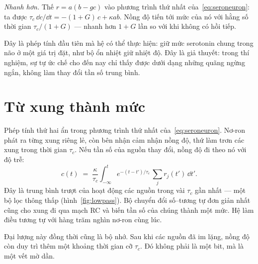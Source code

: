 \emph{Nhanh hơn.} Thế $r=a(b-gc)$ vào phương trình thứ nhất của~\eqref{eq:seroneuron}: ta được $\tau_c\,\dd c/\dd t=-(1+G)\,c+\kappa ab$. Nồng độ tiến tới mức của nó với hằng số thời gian $\tau_c/(1+G)$ --- nhanh hơn $1+G$ lần so với khi không có hồi tiếp.

Đây là phép tính đầu tiên mà hệ  có thể thực hiện: giữ mức serotonin chung trong não ở một giá trị đặt, như bộ ổn nhiệt giữ nhiệt độ. Đây là giả thuyết: trong thí nghiệm, sự tự ức chế cho đến nay chỉ thấy được dưới dạng những quãng ngừng ngắn, không làm thay đổi tần số trung bình.

\section{Từ xung thành mức}

Phép tính thứ hai ẩn trong phương trình thứ nhất của~\eqref{eq:seroneuron}. Nơ-ron phát ra từng xung riêng lẻ, còn bên nhận cảm nhận nồng độ, thứ làm trơn các xung trong thời gian $\tau_c$. Nếu tần số của nguồn thay đổi, nồng độ đi theo nó với độ trễ:
\begin{equation}
c(t) \;=\; \frac{\kappa}{\tau_c}\int_{-\infty}^{t} e^{-(t-t')/\tau_c}\,\sum_j r_j(t')\,\dd t' .
\label{eq:lowpass}
\end{equation}
Đây là trung bình trượt của hoạt động các nguồn trong vài $\tau_c$ gần nhất --- một bộ lọc thông thấp (hình~\ref{fig:lowpass}). Bộ chuyển đổi số--tương tự đơn giản nhất cũng cho xung đi qua mạch RC và biến tần số của chúng thành một mức. Hệ  làm điều tương tự với hàng trăm nghìn nơ-ron cùng lúc.

Đại lượng này đồng thời cũng là bộ nhớ. Sau khi các nguồn đã im lặng, nồng độ còn duy trì thêm một khoảng thời gian cỡ $\tau_c$. Đó không phải là một bit, mà là một vết mờ dần.

